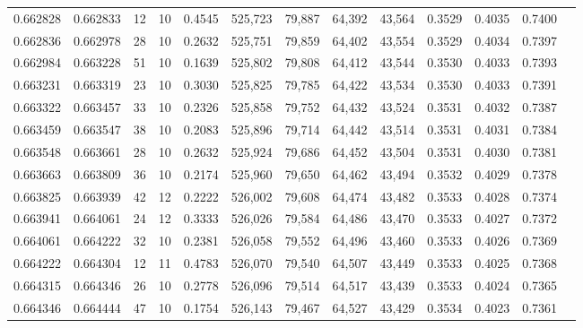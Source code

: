 \begin{tabular}{rrrrrrrrrrrrr}
0.662828 & 0.662833 &    12 &  10 &                                     0.4545 & 525,723 &  79,887 &  64,392 &  43,564 & 0.3529 & 0.4035 & 0.7400 \\
0.662836 & 0.662978 &    28 &  10 &                                     0.2632 & 525,751 &  79,859 &  64,402 &  43,554 & 0.3529 & 0.4034 & 0.7397 \\
0.662984 & 0.663228 &    51 &  10 &                                     0.1639 & 525,802 &  79,808 &  64,412 &  43,544 & 0.3530 & 0.4033 & 0.7393 \\
0.663231 & 0.663319 &    23 &  10 &                                     0.3030 & 525,825 &  79,785 &  64,422 &  43,534 & 0.3530 & 0.4033 & 0.7391 \\
0.663322 & 0.663457 &    33 &  10 &                                     0.2326 & 525,858 &  79,752 &  64,432 &  43,524 & 0.3531 & 0.4032 & 0.7387 \\
0.663459 & 0.663547 &    38 &  10 &                                     0.2083 & 525,896 &  79,714 &  64,442 &  43,514 & 0.3531 & 0.4031 & 0.7384 \\
0.663548 & 0.663661 &    28 &  10 &                                     0.2632 & 525,924 &  79,686 &  64,452 &  43,504 & 0.3531 & 0.4030 & 0.7381 \\
0.663663 & 0.663809 &    36 &  10 &                                     0.2174 & 525,960 &  79,650 &  64,462 &  43,494 & 0.3532 & 0.4029 & 0.7378 \\
0.663825 & 0.663939 &    42 &  12 &                                     0.2222 & 526,002 &  79,608 &  64,474 &  43,482 & 0.3533 & 0.4028 & 0.7374 \\
0.663941 & 0.664061 &    24 &  12 &                                     0.3333 & 526,026 &  79,584 &  64,486 &  43,470 & 0.3533 & 0.4027 & 0.7372 \\
0.664061 & 0.664222 &    32 &  10 &                                     0.2381 & 526,058 &  79,552 &  64,496 &  43,460 & 0.3533 & 0.4026 & 0.7369 \\
0.664222 & 0.664304 &    12 &  11 &                                     0.4783 & 526,070 &  79,540 &  64,507 &  43,449 & 0.3533 & 0.4025 & 0.7368 \\
0.664315 & 0.664346 &    26 &  10 &                                     0.2778 & 526,096 &  79,514 &  64,517 &  43,439 & 0.3533 & 0.4024 & 0.7365 \\
0.664346 & 0.664444 &    47 &  10 &                                     0.1754 & 526,143 &  79,467 &  64,527 &  43,429 & 0.3534 & 0.4023 & 0.7361 \\

\end{tabular}
